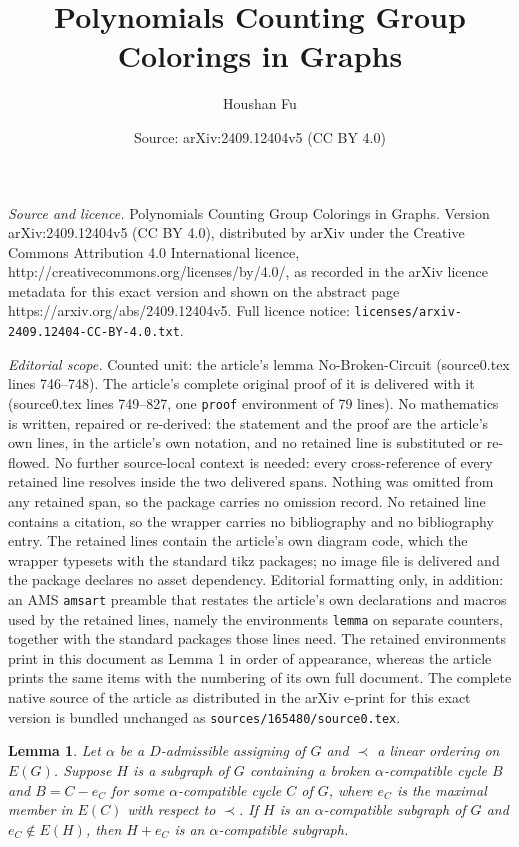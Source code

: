 \documentclass[10pt,a4paper]{amsart}
\title{Polynomials Counting Group Colorings in Graphs}
\author{Houshan Fu}
\date{Source: arXiv:2409.12404v5 (CC BY 4.0)}
\newtheorem{lemma}{Lemma}
\begin{document}
\maketitle

\noindent\emph{Source and licence.} Polynomials Counting Group Colorings in Graphs. Version arXiv:2409.12404v5 (CC BY 4.0), distributed by arXiv under the Creative Commons Attribution 4.0 International licence, http://creativecommons.org/licenses/by/4.0/, as recorded in the arXiv licence metadata for this exact version and shown on the abstract page https://arxiv.org/abs/2409.12404v5. Full licence notice: \texttt{licenses/arxiv-2409.12404-CC-BY-4.0.txt}.\par\smallskip

\noindent\textit{Editorial scope.} Counted unit: the article's lemma No-Broken-Circuit (source0.tex lines 746--748). The article's complete original proof of it is delivered with it (source0.tex lines 749--827, one \texttt{proof} environment of 79 lines). No mathematics is written, repaired or re-derived: the statement and the proof are the article's own lines, in the article's own notation, and no retained line is substituted or re-flowed.  No further source-local context is needed: every cross-reference of every retained line resolves inside the two delivered spans.  Nothing was omitted from any retained span, so the package carries no omission record.  No retained line contains a citation, so the wrapper carries no bibliography and no bibliography entry.  The retained lines contain the article's own diagram code, which the wrapper typesets with the standard tikz packages; no image file is delivered and the package declares no asset dependency.  Editorial formatting only, in addition: an AMS \texttt{amsart} preamble that restates the article's own declarations and macros used by the retained lines, namely the environments \texttt{lemma} on separate counters, together with the standard packages those lines need.  The retained environments print in this document as Lemma 1 in order of appearance, whereas the article prints the same items with the numbering of its own full document.  The complete native source of the article as distributed in the arXiv e-print for this exact version is bundled unchanged as \texttt{sources/165480/source0.tex}.
\begin{lemma}\label{No-Broken-Circuit}
Let $\alpha$ be a $D$-admissible assigning of $G$ and $\prec$ a linear ordering on $E(G)$. Suppose $H$ is a subgraph of $G$ containing a broken $\alpha$-compatible cycle $B$ and $B=C-e_C$ for some $\alpha$-compatible cycle $C$ of $G$, where $e_C$ is the maximal member in $E(C)$ with respect to $\prec$. If $H$ is an $\alpha$-compatible subgraph of $G$ and $e_C\notin E(H)$, then $H+e_C$ is an $\alpha$-compatible subgraph.
\end{lemma}
\end{document}
